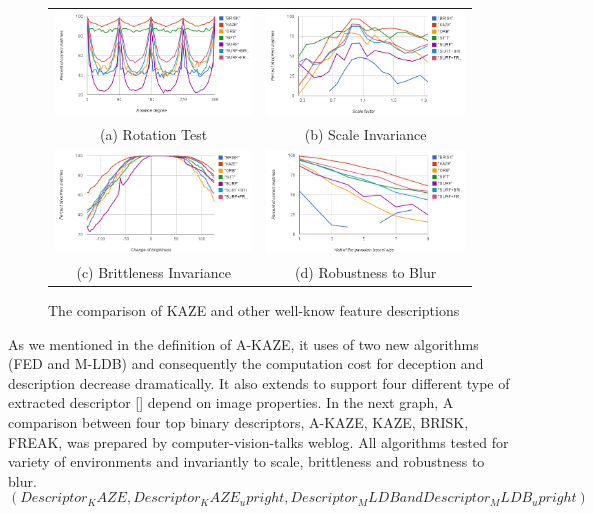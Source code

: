 \begin{figure}[ht]
\begin{tabular}{cc}
  \includegraphics[width=75mm]{figures/rotation_KAZE} &  \includegraphics[width=75mm]{figures/scale_KAZE} \\
(a) Rotation Test & (b) Scale Invariance \\[6pt]
 \includegraphics[width=75mm]{figures/brightness_KAZE} &  \includegraphics[width=75mm]{figures/blur_KAZE} \\
(c) Brittleness Invariance & (d) Robustness to Blur \\[6pt]
\end{tabular}
\caption{The comparison of KAZE and other well-know feature descriptions}\label{fig:compare_kaze}
\end{figure}

As we mentioned in the definition of A-KAZE, it uses of two new algorithms (FED and M-LDB) and consequently the computation cost for deception and description decrease dramatically. It also extends to support four different type of extracted descriptor [] depend on image properties. In the next graph, A comparison between four top binary descriptors, A-KAZE, KAZE, BRISK, FREAK, was prepared by computer-vision-talks weblog. All algorithms tested for variety of environments and invariantly to scale, brittleness and robustness to blur.
$$(Descriptor_KAZE, Descriptor_KAZE_upright, Descriptor_MLDB and Descriptor_MLDB_upright)$$

